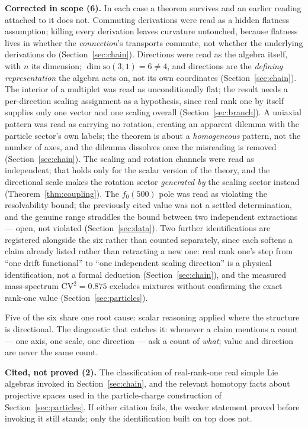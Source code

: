 \documentclass[pdflatex,sn-mathphys-num]{sn-jnl}
\theoremstyle{thmstyleone}
\theoremstyle{thmstylethree}
\theoremstyle{thmstyletwo}
\begin{document}
\textbf{Corrected in scope (6).} In each case a theorem survives and an
earlier reading attached to it does not. Commuting derivations were read
as a hidden flatness assumption; killing every derivation leaves
curvature untouched, because flatness lives in whether the
\emph{connection}'s transports commute, not whether the underlying
derivations do (Section~\ref{sec:chain}). Directions were read as the
algebra itself, with $n$ its dimension; $\dim\mathrm{so}(3,1)=6\neq4$,
and directions are the \emph{defining representation} the algebra acts
on, not its own coordinates (Section~\ref{sec:chain}). The interior of a
multiplet was read as unconditionally flat; the result needs a
per-direction scaling assignment as a hypothesis, since real rank one by
itself supplies only one vector and one scaling overall
(Section~\ref{sec:branch}). A uniaxial pattern was read as carrying no
rotation, creating an apparent dilemma with the particle sector's own
labels; the theorem is about a \emph{homogeneous} pattern, not the
number of axes, and the dilemma dissolves once the misreading is removed
(Section~\ref{sec:chain}). The scaling and rotation channels were read as
independent; that holds only for the scalar version of the theory, and
the directional scale makes the rotation sector \emph{generated by} the
scaling sector instead (Theorem~\ref{thm:coupling}). The $f_0(500)$ pole
was read as violating the resolvability bound; the previously cited
value was not a settled determination, and the genuine range straddles
the bound between two independent extractions — open, not violated
(Section~\ref{sec:data}). Two further identifications are registered
alongside the six rather than counted separately, since each softens a
claim already listed rather than retracting a new one: real rank one's
step from ``one drift functional'' to ``one independent scaling
direction'' is a physical identification, not a formal deduction
(Section~\ref{sec:chain}), and the measured mass-spectrum $\mathrm{CV}^2=0.875$
excludes mixtures without confirming the exact rank-one value
(Section~\ref{sec:particles}).

Five of the six share one root cause: scalar reasoning applied where the
structure is directional. The diagnostic that catches it: whenever a
claim mentions a count — one axis, one scale, one direction — ask a
count of \emph{what}; value and direction are never the same count.

\textbf{Cited, not proved (2).} The classification of real-rank-one real
simple Lie algebras invoked in Section~\ref{sec:chain}, and the relevant
homotopy facts about projective spaces used in the particle-charge
construction of Section~\ref{sec:particles}. If either citation fails,
the weaker statement proved before invoking it still stands; only the
identification built on top does not.
\end{document}
